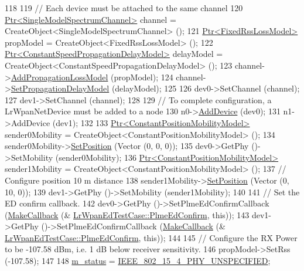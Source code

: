 \begin{DoxyCode}
118 
119   \textcolor{comment}{// Each device must be attached to the same channel}
120   \hyperlink{classns3_1_1Ptr}{Ptr<SingleModelSpectrumChannel>} channel = 
      CreateObject<SingleModelSpectrumChannel> ();
121   \hyperlink{classns3_1_1Ptr}{Ptr<FixedRssLossModel>} propModel = CreateObject<FixedRssLossModel> ();
122   \hyperlink{classns3_1_1Ptr}{Ptr<ConstantSpeedPropagationDelayModel>} delayModel = 
      CreateObject<ConstantSpeedPropagationDelayModel> ();
123   channel->\hyperlink{classns3_1_1SingleModelSpectrumChannel_a3d8c68e54e0e7659fdf715260d5613ac}{AddPropagationLossModel} (propModel);
124   channel->\hyperlink{classns3_1_1SingleModelSpectrumChannel_afd757c085623596ebf3da8264cfbaa45}{SetPropagationDelayModel} (delayModel);
125 
126   dev0->SetChannel (channel);
127   dev1->SetChannel (channel);
128 
129   \textcolor{comment}{// To complete configuration, a LrWpanNetDevice must be added to a node}
130   n0->\hyperlink{classns3_1_1Node_a42ff83ee1d5d1649c770d3f5b62375de}{AddDevice} (dev0);
131   n1->AddDevice (dev1);
132 
133   \hyperlink{classns3_1_1Ptr}{Ptr<ConstantPositionMobilityModel>} sender0Mobility = 
      CreateObject<ConstantPositionMobilityModel> ();
134   sender0Mobility->\hyperlink{classns3_1_1MobilityModel_ac584b3d5a309709d2f13ed6ada1e7640}{SetPosition} (Vector (0, 0, 0));
135   dev0->GetPhy ()->SetMobility (sender0Mobility);
136   \hyperlink{classns3_1_1Ptr}{Ptr<ConstantPositionMobilityModel>} sender1Mobility = 
      CreateObject<ConstantPositionMobilityModel> ();
137   \textcolor{comment}{// Configure position 10 m distance}
138   sender1Mobility->\hyperlink{classns3_1_1MobilityModel_ac584b3d5a309709d2f13ed6ada1e7640}{SetPosition} (Vector (0, 10, 0));
139   dev1->GetPhy ()->SetMobility (sender1Mobility);
140 
141   \textcolor{comment}{// Set the ED confirm callback.}
142   dev0->GetPhy ()->SetPlmeEdConfirmCallback (\hyperlink{group__makecallbackmemptr_ga9376283685aa99d204048d6a4b7610a4}{MakeCallback} (&
      \hyperlink{classLrWpanEdTestCase_acbc6e6847dbe21b4984393c0e4d9f57e}{LrWpanEdTestCase::PlmeEdConfirm}, \textcolor{keyword}{this}));
143   dev1->GetPhy ()->SetPlmeEdConfirmCallback (\hyperlink{group__makecallbackmemptr_ga9376283685aa99d204048d6a4b7610a4}{MakeCallback} (&
      \hyperlink{classLrWpanEdTestCase_acbc6e6847dbe21b4984393c0e4d9f57e}{LrWpanEdTestCase::PlmeEdConfirm}, \textcolor{keyword}{this}));
144 
145   \textcolor{comment}{// Configure the RX Power to be -107.58 dBm, i.e. 1 dB below receiver sensitivity.}
146   propModel->SetRss (-107.58);
147 
148   \hyperlink{classLrWpanEdTestCase_a412f77be5f81e80661cf8e5563e62851}{m\_status} = \hyperlink{group__lr-wpan_gga6494269d13d45c511a07b7ccbb1de754a33aedad985a3e4dd7a0c6790a2c677a0}{IEEE\_802\_15\_4\_PHY\_UNSPECIFIED};

\end{DoxyCode}
